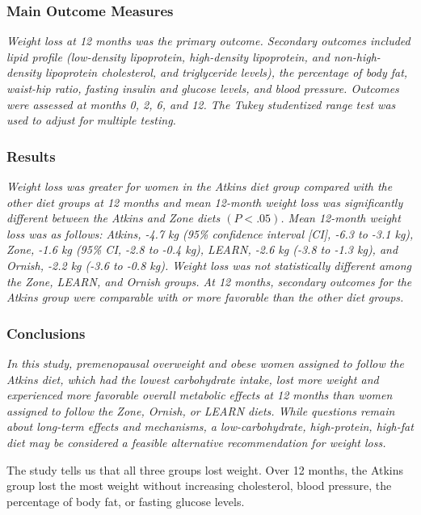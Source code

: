 \documentclass[11pt]{book}\usepackage[]{graphicx}\usepackage[]{color}
\begin{document}
\subsubsection{Main Outcome Measures}

\textit{Weight loss at 12 months was the primary outcome.  Secondary outcomes included lipid profile (low-density lipoprotein, high-density lipoprotein, and non-high-density lipoprotein cholesterol, and triglyceride levels), the percentage of body fat, waist-hip ratio, fasting insulin and glucose levels, and blood pressure. Outcomes were assessed at months 0, 2, 6, and 12. The Tukey studentized range test was used to adjust for multiple testing.}

\subsubsection{Results}

\textit{Weight loss was greater for women in the Atkins diet group compared with the other diet groups at 12 months and mean 12-month weight loss was significantly different between the Atkins and Zone diets $(P<.05)$. Mean 12-month weight loss was as follows: Atkins, -4.7 kg (95\% confidence interval [CI], -6.3 to -3.1 kg), Zone, -1.6 kg (95\% CI, -2.8 to -0.4 kg), LEARN, -2.6 kg (-3.8 to -1.3 kg), and Ornish, -2.2 kg (-3.6 to -0.8 kg). Weight loss was not statistically different among the Zone, LEARN, and Ornish groups. At 12 months, secondary outcomes for the Atkins group were comparable with or more favorable than the other diet groups.}

\subsubsection{Conclusions}

\textit{In this study, premenopausal overweight and obese women assigned to follow the Atkins diet, which had the lowest carbohydrate intake, lost more weight and experienced more favorable overall metabolic effects at 12 months than women assigned to follow the Zone, Ornish, or LEARN diets. While questions remain about long-term effects and mechanisms, a low-carbohydrate, high-protein, high-fat diet may be considered a feasible alternative recommendation for weight loss.}

The study tells us that all three groups lost weight.  Over 12 months, the Atkins group lost the most weight without increasing cholesterol, blood pressure, the percentage of body fat, or fasting glucose levels.
\end{document}
